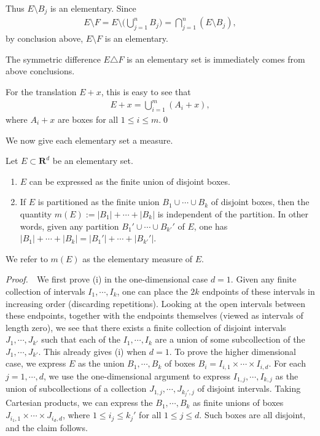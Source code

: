 \documentclass{book}
\theoremstyle{defstyle}
\theoremstyle{thmstyle}
\newcommand{\pff}{\noindent\emph{Proof.}~~}
\newcommand{\newa}{\vspace{1em}\indent}
\begin{document}
Thus $E \setminus B_j$ is an elementary. Since
    \begin{align*}
        E \setminus F
        = E \setminus \Big(\bigcup_{j = 1}^{n} B_j\Big)
        = \bigcap_{j = 1}^{n} (E \setminus B_j),
    \end{align*}
by conclusion above, $E \setminus F$ is an elementary.

The symmetric difference $E \triangle F$ is an elementary set is immediately comes from above conclusions.

For the translation $E + x$, this is easy to see that
    \begin{align*}
        E + x = \bigcup_{i = 1}^{m} (A_i + x),
    \end{align*}
where $A_i + x$ are boxes for all $1 \leq i \leq m$.\qed

\newa We now give each elementary set a measure.

\begin{lemma}\label{thm:measure of an elementary set}
    Let $E \subset \mathbf{R}^d$ be an elementary set.
    \begin{enumerate}
        \item $E$ can be expressed as the finite union of disjoint boxes.
        \item If $E$ is partitioned as the finite union $B_1 \cup \cdots \cup B_k$ of disjoint boxes, then the quantity $m(E) := |B_1| + \cdots + |B_k|$ is independent of the partition. In other words, given any partition $B_1' \cup \cdots \cup B_{k'}'$ of $E$, one has $|B_1| + \cdots + |B_k| = |B_1'| + \cdots + |B_{k'}'|$.
    \end{enumerate}
    We refer to $m(E)$ as the elementary measure of $E$.
\end{lemma}

\pff We first prove (i) in the one-dimensional case $d = 1$. Given any finite collection of intervals $I_1, \cdots , I_k$, one can place the $2k$ endpoints of these intervals in increasing order (discarding repetitions). Looking at the open intervals between these endpoints, together with the endpoints themselves (viewed as intervals of length zero), we see that there exists a finite collection of disjoint intervals $J_1, \cdots ,J_{k'}$ such that each of the $I_1, \cdots , I_k$ are a union of some subcollection of the $J_1, \cdots ,J_{k'}$. This already gives (i) when $d = 1$. To prove the higher dimensional case, we express $E$ as the union $B_1, \cdots , B_k$ of boxes $B_i = I_{i, 1} \times \cdots \times I_{i, d}$. For each $j = 1, \cdots ,d$, we use the one-dimensional argument to express $I_{1, j} , \cdots , I_{k, j}$ as the union of subcollections of a collection $J_{1,j} , \cdots , J_{k_j', j}$ of disjoint intervals. Taking Cartesian products, we can express the $B_1, \cdots , B_k$ as finite unions of boxes $J_{i_1, 1} \times \cdots \times J_{i_d, d}$, where $1 \leq  i_j \leq k_j'$ for all $1 \leq j \leq d$. Such boxes are all disjoint, and the claim follows.
\end{document}

